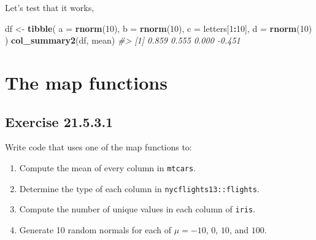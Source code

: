 \documentclass[]{book}
\newenvironment{Shaded}{\begin{snugshade}}{\end{snugshade}}
\newcommand{\CommentTok}[1]{\textcolor[rgb]{0.56,0.35,0.01}{\textit{#1}}}
\newcommand{\DataTypeTok}[1]{\textcolor[rgb]{0.13,0.29,0.53}{#1}}
\newcommand{\DecValTok}[1]{\textcolor[rgb]{0.00,0.00,0.81}{#1}}
\newcommand{\KeywordTok}[1]{\textcolor[rgb]{0.13,0.29,0.53}{\textbf{#1}}}
\newcommand{\NormalTok}[1]{#1}
\newcommand{\OperatorTok}[1]{\textcolor[rgb]{0.81,0.36,0.00}{\textbf{#1}}}
\newcommand{\StringTok}[1]{\textcolor[rgb]{0.31,0.60,0.02}{#1}}
\providecommand{\tightlist}{%
  \setlength{\itemsep}{0pt}\setlength{\parskip}{0pt}}
\theoremstyle{plain}
\theoremstyle{remark}
\begin{document}
Let's test that it works,

\begin{Shaded}
\begin{Highlighting}[]
\NormalTok{df <-}\StringTok{ }\KeywordTok{tibble}\NormalTok{(}
  \DataTypeTok{a =} \KeywordTok{rnorm}\NormalTok{(}\DecValTok{10}\NormalTok{),}
  \DataTypeTok{b =} \KeywordTok{rnorm}\NormalTok{(}\DecValTok{10}\NormalTok{),}
  \DataTypeTok{c =}\NormalTok{ letters[}\DecValTok{1}\OperatorTok{:}\DecValTok{10}\NormalTok{],}
  \DataTypeTok{d =} \KeywordTok{rnorm}\NormalTok{(}\DecValTok{10}\NormalTok{)}
\NormalTok{)}
\KeywordTok{col_summary2}\NormalTok{(df, mean)}
\CommentTok{#> [1]  0.859  0.555  0.000 -0.451}
\end{Highlighting}
\end{Shaded}

\hypertarget{the-map-functions}{%
\section{The map functions}\label{the-map-functions}}

\hypertarget{exercise-21.5.3.1}{%
\subsection*{\texorpdfstring{Exercise
{21.5.3.1}}{Exercise 21.5.3.1}}\label{exercise-21.5.3.1}}

Write code that uses one of the map functions to:

\begin{enumerate}
\def\labelenumi{\arabic{enumi}.}
\tightlist
\item
  Compute the mean of every column in \texttt{mtcars}.
\item
  Determine the type of each column in \texttt{nycflights13::flights}.
\item
  Compute the number of unique values in each column of \texttt{iris}.
\item
  Generate 10 random normals for each of \(\mu = -10\), \(0\), \(10\),
  and \(100\).
\end{enumerate}
\end{document}
